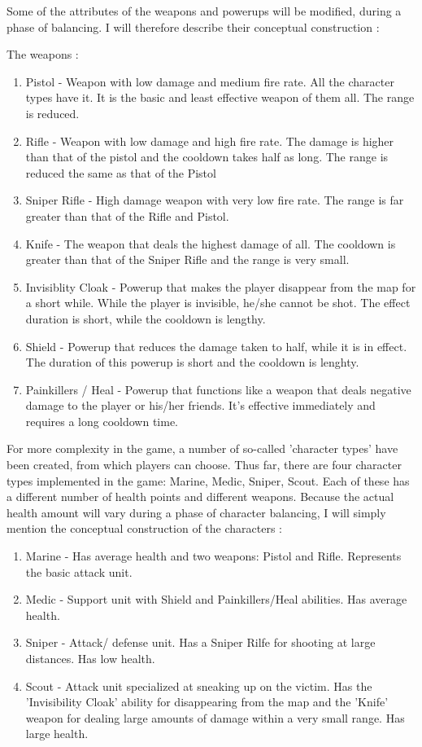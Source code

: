 \documentclass{article}
\begin{document}
Some of the attributes of the weapons and powerups will be modified, during a
phase of balancing. I will therefore describe their conceptual construction : 

The weapons : 
\begin{enumerate}
  \item Pistol - Weapon with low damage and medium fire rate. All the character
  types have it. It is the basic and least effective weapon of them all. The
  range is reduced.
  \item Rifle - Weapon with low damage and high fire rate. The damage is higher
  than that of the pistol and the cooldown takes half as long. The range is
  reduced the same as that of the Pistol
  \item Sniper Rifle - High damage weapon with very low fire rate. The range is
  far greater than that of the Rifle and Pistol.
  \item Knife - The weapon that deals the highest damage of all. The cooldown is
  greater than that of the Sniper Rifle and the range is very small. 
  \item Invisiblity Cloak - Powerup that makes the player disappear from the
  map for a short while. While the player is invisible, he/she cannot be shot.
  The effect duration is short, while the cooldown is lengthy.
  \item Shield - Powerup that reduces the damage taken to half, while it is in
  effect. The duration of this powerup is short and the cooldown is lenghty.
  \item Painkillers / Heal - Powerup that functions like a weapon that deals
  negative damage to the player or his/her friends. It's effective immediately
  and requires a long cooldown time.
\end{enumerate}

For more complexity in the game, a number of so-called 'character types' have
been created, from which players can choose. Thus far, there are four character
types implemented in the game: Marine, Medic, Sniper, Scout. Each of these has a
different number of health points and different weapons. Because the actual
health amount will vary during a phase of character balancing, I will simply
mention the conceptual construction of the characters :
\begin{enumerate}
  \item Marine - Has average health and two weapons: Pistol and Rifle.
  Represents the basic attack unit.
  \item Medic - Support unit with Shield and Painkillers/Heal abilities. Has
  average health. 
  \item Sniper - Attack/ defense unit. Has a Sniper Rilfe for shooting at large
  distances. Has low health.
  \item Scout - Attack unit specialized at sneaking up on the victim. Has the
  'Invisibility Cloak' ability for disappearing from the map and the 'Knife'
  weapon for dealing large amounts of damage within a very small range. Has
  large health.
\end{enumerate}
\end{document}
